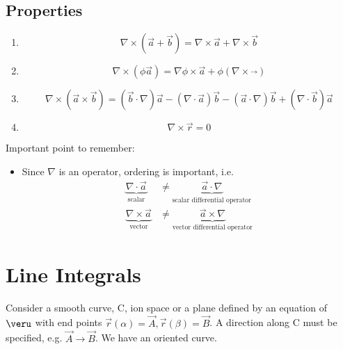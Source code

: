 \documentclass[a4paper, 11pt, normalem]{report}
\begin{document}
\subsection{Properties}
\begin{enumerate}
    \item
            \begin{equation*}
                \nabla \times (\vec{a} + \vec{b}) = \nabla \times \vec{a} + \nabla \times \vec{b}
            \end{equation*}
    \item
            \begin{equation*}
                \nabla \times (\phi \vec{a}) = \nabla\phi \times \vec{a} + \phi(\nabla\times\vec{})
            \end{equation*}
    \item
            \begin{equation*}
                \nabla\times(\vec{a}\times\vec{b}) = (\vec{b}\cdot\nabla)\vec{a} - (\nabla\cdot\vec{a})\vec{b} - (\vec{a}\cdot\nabla)\vec{b} + (\nabla\cdot\vec{b})\vec{a}
            \end{equation*}
    \item
            \begin{equation*}
                \nabla \times \vec{r} = 0
            \end{equation*}
\end{enumerate}
Important point to remember:
\begin{itemize}
    \item Since $\nabla$ is an operator, ordering is important, i.e.
            \begin{align*}
                \underbrace{\nabla\cdot\vec{a}}_{\text{scalar}} &\neq \underbrace{\vec{a}\cdot\nabla}_{\text{scalar differential operator}} \\
                \underbrace{\nabla \times \vec{a}}_{\text{vector}} &\neq \underbrace{\vec{a}\times\nabla}_{\text{vector differential operator}}
            \end{align*}
\end{itemize}

\section{Line Integrals}
Consider a smooth curve, C, ion space or a plane defined by an equation of $\veru$ with end points $\vec{r}(\alpha) = \vec{A}, \vec{r}(\beta) = \vec{B}$.
A direction along C must be specified, e.g. $\vec{A} \to \vec{B}$. We have an oriented curve.
\end{document}
